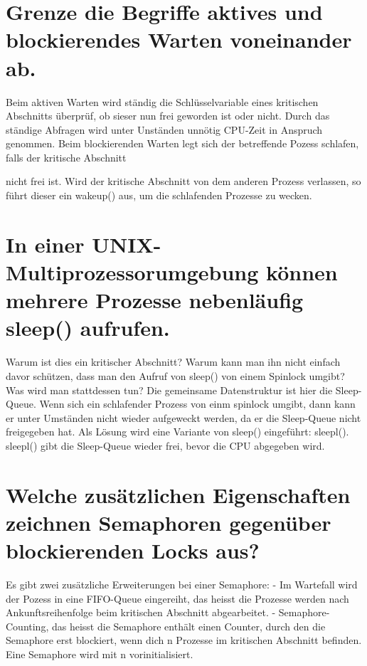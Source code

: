 \documentclass[12pt,a4paper,ngerman]{scrartcl}
\newcommand{\question}[1]{#1}
\newenvironment {answer}
                {}
                {}
\begin{document}
\section{\question{Grenze die Begriffe aktives und blockierendes Warten voneinander ab.}}
\begin{answer}
Beim aktiven Warten wird ständig die Schlüsselvariable eines kritischen Abschnitts überprüf, ob sieser nun frei geworden ist oder nicht. Durch das ständige Abfragen wird unter Unständen unnötig CPU-Zeit in Anspruch genommen.
Beim blockierenden Warten legt sich der betreffende Pozess schlafen, falls der kritische Abschnitt

nicht frei ist. Wird der kritische Abschnitt von dem anderen Prozess verlassen, so führt dieser ein
wakeup() aus, um die schlafenden Prozesse zu wecken.
\end{answer}

\section{\question{In einer UNIX-Multiprozessorumgebung können mehrere Prozesse nebenläufig sleep() aufrufen.}}
\begin{answer}
Warum ist dies ein kritischer Abschnitt? Warum kann man ihn nicht einfach davor schützen, dass
man den Aufruf von sleep() von einem Spinlock umgibt? Was wird man stattdessen tun?
Die gemeinsame Datenstruktur ist hier die Sleep-Queue. Wenn sich ein schlafender Prozess von
einm spinlock umgibt, dann kann er unter Umständen nicht wieder aufgeweckt werden, da er die
Sleep-Queue nicht freigegeben hat. Als Lösung wird eine Variante von sleep() eingeführt: sleepl().
sleepl() gibt die Sleep-Queue wieder frei, bevor die CPU abgegeben wird.
\end{answer}

\section{\question{Welche zusätzlichen Eigenschaften zeichnen Semaphoren gegenüber blockierenden Locks aus?}}
\begin{answer}
Es gibt zwei zusätzliche Erweiterungen bei einer Semaphore:
- Im Wartefall wird der Pozess in eine FIFO-Queue eingereiht, das heisst die Prozesse werden nach
Ankunftsreihenfolge beim kritischen Abschnitt abgearbeitet.
- Semaphore-Counting, das heisst die Semaphore enthält einen Counter, durch den die Semaphore
erst blockiert, wenn dich n Prozesse im kritischen Abschnitt befinden. Eine Semaphore wird mit
n vorinitialisiert.
\end{answer}
\end{document}
